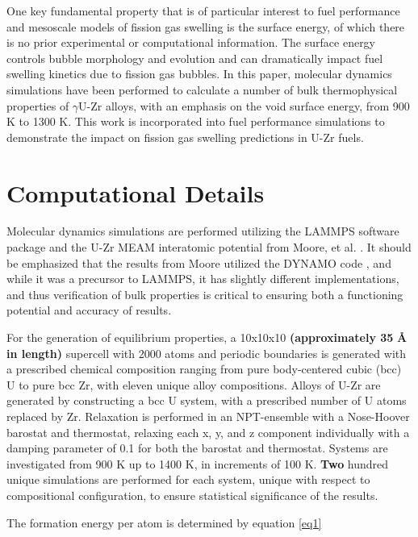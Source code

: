 \documentclass[review]{elsarticle}
\providecommand{\DIFaddtex}[1]{{\bf #1}} %
\providecommand{\DIFdeltex}[1]{} %
\providecommand{\DIFaddbegin}{\protect\color{blue}} %
\providecommand{\DIFaddend}{\protect\color{black}} %
\providecommand{\DIFdelbegin}{\protect\color{red}} %
\providecommand{\DIFdelend}{\protect\color{black}} %
\providecommand{\DIFadd}[1]{\texorpdfstring{\DIFaddtex{#1}}{#1}} %
\providecommand{\DIFdel}[1]{\texorpdfstring{\DIFdeltex{#1}}{}} %
\newcommand{\DIFscaledelfig}{0.5}
\newlength{\DIFdelgraphicswidth} %
\newlength{\DIFdelgraphicsheight} %
\newcommand{\DIFaddincludegraphics}[2][]{{\color{blue}\fbox{\DIFOincludegraphics[#1]{#2}}}} %
\newcommand{\DIFdelincludegraphics}[2][]{%
\sbox{\DIFdelgraphicsbox}{\DIFOincludegraphics[#1]{#2}}%
\settoboxwidth{\DIFdelgraphicswidth}{\DIFdelgraphicsbox} %
\settoboxtotalheight{\DIFdelgraphicsheight}{\DIFdelgraphicsbox} %
\scalebox{\DIFscaledelfig}{%
\parbox[b]{\DIFdelgraphicswidth}{\usebox{\DIFdelgraphicsbox}\\[-\baselineskip] \rule{\DIFdelgraphicswidth}{0em}}\llap{\resizebox{\DIFdelgraphicswidth}{\DIFdelgraphicsheight}{%
\setlength{\unitlength}{\DIFdelgraphicswidth}%
\begin{picture}(1,1)%
\thicklines\linethickness{2pt} %
{\color[rgb]{1,0,0}\put(0,0){\framebox(1,1){}}}%
{\color[rgb]{1,0,0}\put(0,0){\line( 1,1){1}}}%
{\color[rgb]{1,0,0}\put(0,1){\line(1,-1){1}}}%
\end{picture}%
}\hspace*{3pt}}} %
} %
\DeclareRobustCommand{\DIFaddbegin}{\DIFOaddbegin \let\includegraphics\DIFaddincludegraphics} %
\DeclareRobustCommand{\DIFaddend}{\DIFOaddend \let\includegraphics\DIFOincludegraphics} %
\DeclareRobustCommand{\DIFdelbegin}{\DIFOdelbegin \let\includegraphics\DIFdelincludegraphics} %
\DeclareRobustCommand{\DIFdelend}{\DIFOaddend \let\includegraphics\DIFOincludegraphics} %
\begin{document}
One key fundamental property that is of particular interest to fuel performance and mesoscale models of fission gas swelling is the surface energy, of which there is no prior experimental or computational information. The surface energy controls bubble morphology and evolution and can dramatically impact fuel swelling kinetics due to fission gas bubbles.  In this paper, molecular dynamics simulations have been performed to calculate a number of bulk thermophysical properties of $\gamma$U-Zr alloys, with an emphasis on the void surface energy, from 900 K to 1300 K. This work is incorporated into fuel performance simulations to demonstrate the impact on fission gas swelling predictions in U-Zr fuels.

\section{Computational Details}

Molecular dynamics simulations are performed utilizing the LAMMPS \cite{plimpton1995} software package and the U-Zr MEAM interatomic potential from Moore, et al. \cite{moore2015}. It should be emphasized that the results from Moore \cite{moore2015} utilized the DYNAMO code \cite{dynamo}, and while it was a precursor to LAMMPS, it has slightly different implementations, and thus verification of bulk properties is critical to ensuring both a functioning potential and accuracy of results. 

For the generation of equilibrium properties, a 10x10x10 \DIFaddbegin \DIFadd{(approximately 35 }{\DIFadd{\AA}} \DIFadd{in length) }\DIFaddend supercell with 2000 atoms and periodic boundaries is generated with a prescribed chemical composition ranging from pure body-centered cubic (bcc) U to pure bcc Zr, with eleven unique alloy compositions. Alloys of U-Zr are generated by constructing a bcc U system, with a prescribed number of U atoms replaced by Zr. Relaxation is performed in an NPT-ensemble with a Nose-Hoover barostat and thermostat, relaxing each x, y, and z component individually with a damping parameter of 0.1 for both the barostat and thermostat. Systems are investigated from 900 K up to 1400 K, in increments of 100 K. \DIFdelbegin \DIFdel{One }\DIFdelend \DIFaddbegin \DIFadd{Two }\DIFaddend hundred unique simulations are performed for each system, unique with respect to compositional configuration, to ensure statistical significance of the results.

The formation energy per atom is determined by equation \ref{eq1}
\end{document}
